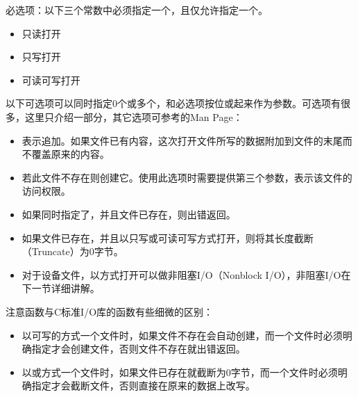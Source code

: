 必选项：以下三个常数中必须指定一个，且仅允许指定一个。


\begin{itemize}

\item {} 只读打开

\item {} 只写打开

\item {} 可读可写打开
\end{itemize}


以下可选项可以同时指定0个或多个，和必选项按位或起来作为参数。可选项有很多，这里只介绍一部分，其它选项可参考的Man Page：


\begin{itemize}

\item {} 表示追加。如果文件已有内容，这次打开文件所写的数据附加到文件的末尾而不覆盖原来的内容。

\item {} 若此文件不存在则创建它。使用此选项时需要提供第三个参数，表示该文件的访问权限。

\item {} 如果同时指定了，并且文件已存在，则出错返回。

\item {} 如果文件已存在，并且以只写或可读可写方式打开，则将其长度截断（Truncate）为0字节。

\item {} 对于设备文件，以方式打开可以做非阻塞I/\BookSplit{}O（Nonblock I/\BookSplit{}O），非阻塞I/\BookSplit{}O在下一节详细讲解。
\end{itemize}


注意函数与C标准I/\BookSplit{}O库的函数有些细微的区别：


\begin{itemize}

\item 以可写的方式一个文件时，如果文件不存在会自动创建，而一个文件时必须明确指定才会创建文件，否则文件不存在就出错返回。

\item 以或方式一个文件时，如果文件已存在就截断为0字节，而一个文件时必须明确指定才会截断文件，否则直接在原来的数据上改写。
\end{itemize}


